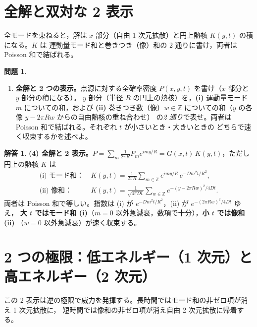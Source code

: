\documentclass[dvipdfmx, uplatex]{jsarticle}
\theoremstyle{definition}
\newtheorem*{prob}{問題}
\newtheorem*{sol}{解答}
\begin{document}
\section{全解と双対な 2 表示}
全モードを束ねると，解は $x$ 部分（自由 1 次元拡散）と円上熱核 $K(y,t)$ の積になる。$K$ は
運動量モード和と巻きつき（像）和の 2 通りに書け，両者は Poisson 和で結ばれる。

\begin{prob}
\begin{enumerate}[start=4]
\item \textbf{全解と 2 つの表示。}点源に対する全確率密度 $P(x,y,t)$ を書け（$x$ 部分と $y$ 部分の積になる）。
$y$ 部分（半径 $R$ の円上の熱核）を，\textbf{(i)} 運動量モード $m$ についての和，および
\textbf{(ii)} 巻きつき数（像）$w\in\mathbb{Z}$ についての和（$y$ の各像 $y-2\pi Rw$ からの自由熱核の重ね合わせ）
の\emph{2 通り}で表せ。両者は Poisson 和で結ばれる。それぞれ $t$ が小さいとき・大きいときの
どちらで速く収束するかを述べよ。
\end{enumerate}
\end{prob}

\begin{sol}
\textbf{(4) 全解と 2 表示。}$P=\sum_m\frac{1}{2\pi R}P_m e^{imy/R}=G(x,t)\,K(y,t)$，ただし円上の熱核 $K$ は
\begin{align*}
    \text{(i) モード和：}&\ \boxed{K(y,t)=\frac{1}{2\pi R}\sum_{m\in\mathbb{Z}}e^{imy/R}\,e^{-Dm^2t/R^2}},\\
    \text{(ii) 像和：}&\ \boxed{K(y,t)=\frac{1}{\sqrt{4\pi Dt}}\sum_{w\in\mathbb{Z}}e^{-(y-2\pi Rw)^2/4Dt}}.
\end{align*}
両者は Poisson 和で等しい。指数は (i) が $e^{-Dm^2t/R^2}$，(ii) が $e^{-(2\pi Rw)^2/4Dt}$ ゆえ，
\textbf{大 $t$ ではモード和 (i)}（$m=0$ 以外急減衰，数項で十分），\textbf{小 $t$ では像和 (ii)}
（$w=0$ 以外急減衰）が速く収束する。
\end{sol}

\section{2 つの極限：低エネルギー（1 次元）と高エネルギー（2 次元）}
この 2 表示は逆の極限で威力を発揮する。長時間ではモード和の非ゼロ項が消え 1 次元拡散に，
短時間では像和の非ゼロ項が消え自由 2 次元拡散に帰着する。
\end{document}
